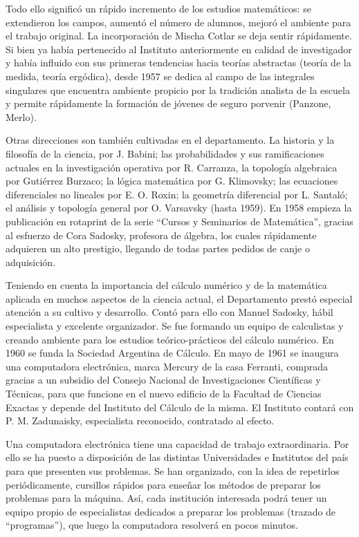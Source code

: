 Todo ello significó un rápido incremento de los estudios matemáticos: se
extendieron los campos, aumentó el número de alumnos, mejoró el ambiente para
el trabajo original. La incorporación de Mischa Cotlar se deja sentir
rápidamente. Si bien ya había pertenecido al Instituto anteriormente en calidad
de investigador y había influido con sus primeras tendencias hacia teorías
abstractas (teoría de la medida, teoría ergódica), desde 1957 se dedica al
campo de las integrales singulares que encuentra ambiente propicio por la
tradición analista de la escuela y permite rápidamente la formación de jóvenes
de seguro porvenir (Panzone, Merlo).

Otras direcciones son también cultivadas en el departamento. La historia y la
filosofía de la ciencia, por J. Babini; las probabilidades y sus ramificaciones
actuales en la investigación operativa por R. Carranza, la topología algebraica
por Gutiérrez Burzaco; la lógica matemática por G. Klimovsky; las ecuaciones
diferenciales no lineales por E. O. Roxin; la geometría diferencial por L.
Santaló; el análisis y topología general por O. Varsavsky (hasta 1959). En 1958
empieza la publicación en rotaprint de la serie ``Cursos y Seminarios de
Matemática'', gracias al esfuerzo de Cora Sadosky, profesora de álgebra, los
cuales rápidamente adquieren un alto prestigio, llegando de todas partes
pedidos de canje o adquisición.

Teniendo en cuenta la importancia del cálculo numérico y de la matemática
aplicada en muchos aspectos de la ciencia actual, el Departamento prestó
especial atención a su cultivo y desarrollo. Contó para ello con Manuel
Sadosky, hábil especialista y excelente organizador. Se fue formando un equipo
de calculistas y creando ambiente para los estudios teórico-prácticos del
cálculo numérico. En 1960 se funda la Sociedad Argentina de Cálculo. En mayo de
1961 se inaugura una computadora electrónica, marca Mercury de la casa
Ferranti, comprada gracias a un subsidio del Consejo Nacional de
Investigaciones Científicas y Técnicas, para que funcione en el nuevo edificio
de la Facultad de Ciencias Exactas y depende del Instituto del Cálculo de la
misma. El Instituto contará con P. M. Zadunaisky, especialista reconocido,
contratado al efecto.

Una computadora electrónica tiene una capacidad de trabajo extraordinaria. Por
ello se ha puesto a disposición de las distintas Universidades e Institutos del
país para que presenten sus problemas. Se han organizado, con la idea de
repetirlos periódicamente, cursillos rápidos para enseñar los métodos de
preparar los problemas para la máquina. Así, cada institución interesada podrá
tener un equipo propio de especialistas dedicados a preparar los problemas
(trazado de ``programas''), que luego la computadora resolverá en pocos
minutos.

